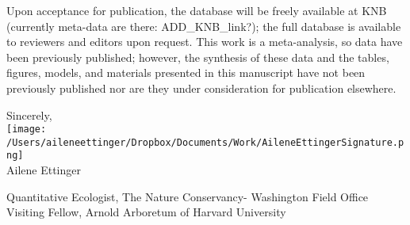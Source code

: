 \documentclass[11.5pt,a4paper]{letter}
\begin{document}
\begin{letter}{}
\par Upon acceptance for publication, the database will be freely available at KNB (currently meta-data are there: ADD_KNB_link?); the full database is available to reviewers and editors upon request. This work is a meta-analysis, so data have been previously published; however, the synthesis of these data and the tables, figures, models, and materials presented in this manuscript have not been previously published nor are they under consideration for publication elsewhere.

Sincerely,\\

\texttt{[image: /Users/aileneettinger/Dropbox/Documents/Work/AileneEttingerSignature.png]} \\
Ailene Ettinger\\
\begin{footnotesize}
Quantitative Ecologist, The Nature Conservancy- Washington Field Office
Visiting Fellow, Arnold Arboretum of Harvard University 
\end{footnotesize}

\end{letter}
\end{document}
